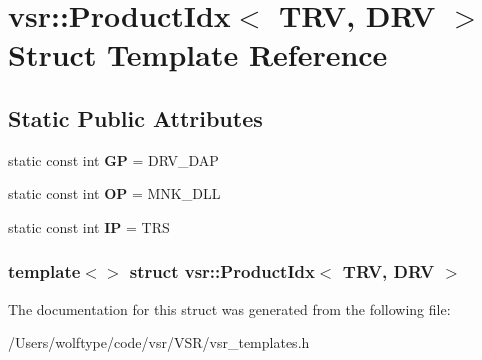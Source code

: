 \hypertarget{structvsr_1_1_product_idx_3_01_t_r_v_00_01_d_r_v_01_4}{\section{vsr\-:\-:Product\-Idx$<$ T\-R\-V, D\-R\-V $>$ Struct Template Reference}
\label{structvsr_1_1_product_idx_3_01_t_r_v_00_01_d_r_v_01_4}
}
\subsection*{Static Public Attributes}
\begin{DoxyCompactItemize}
\item 
\hypertarget{structvsr_1_1_product_idx_3_01_t_r_v_00_01_d_r_v_01_4_af6f21862cba531e1cd5d97ffaec269a5}{static const int {\bfseries G\-P} = D\-R\-V\-\_\-\-D\-A\-P}\label{structvsr_1_1_product_idx_3_01_t_r_v_00_01_d_r_v_01_4_af6f21862cba531e1cd5d97ffaec269a5}

\item 
\hypertarget{structvsr_1_1_product_idx_3_01_t_r_v_00_01_d_r_v_01_4_add2642d1dd2170df297e5ccb22f85067}{static const int {\bfseries O\-P} = M\-N\-K\-\_\-\-D\-L\-L}\label{structvsr_1_1_product_idx_3_01_t_r_v_00_01_d_r_v_01_4_add2642d1dd2170df297e5ccb22f85067}

\item 
\hypertarget{structvsr_1_1_product_idx_3_01_t_r_v_00_01_d_r_v_01_4_ab62e66d1ad088e30746e340ae1ba3149}{static const int {\bfseries I\-P} = T\-R\-S}\label{structvsr_1_1_product_idx_3_01_t_r_v_00_01_d_r_v_01_4_ab62e66d1ad088e30746e340ae1ba3149}

\end{DoxyCompactItemize}
\subsubsection*{template$<$$>$ struct vsr\-::\-Product\-Idx$<$ T\-R\-V, D\-R\-V $>$}



The documentation for this struct was generated from the following file\-:\begin{DoxyCompactItemize}
\item 
/\-Users/wolftype/code/vsr/\-V\-S\-R/vsr\-\_\-templates.\-h\end{DoxyCompactItemize}
